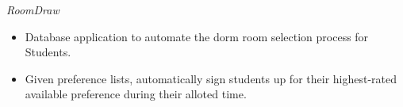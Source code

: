 {\sl RoomDraw}
\begin{itemize} \itemsep -2pt %
\item Database application to automate the dorm room selection process for Students.
\item Given preference lists, automatically sign students up for their highest-rated available preference during their alloted time.
\end{itemize}
